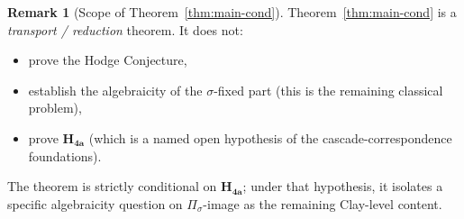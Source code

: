 \documentclass[11pt, a4paper]{amsart}
\theoremstyle{definition}
\newtheorem{remark}[theorem]{Remark}
\begin{document}
\begin{remark}[Scope of Theorem~\ref{thm:main-cond}]
\label{rmk:scope-main}
Theorem~\ref{thm:main-cond} is a \emph{transport / reduction}
theorem. It does not:
\begin{itemize}
\item prove the Hodge Conjecture,
\item establish the algebraicity of the $\sigma$-fixed part (this
  is the remaining classical problem),
\item prove $\mathbf{H_{4a}}$ (which is a named open hypothesis of
  the cascade-correspondence foundations).
\end{itemize}
The theorem is strictly conditional on $\mathbf{H_{4a}}$; under
that hypothesis, it isolates a specific algebraicity question on
$\Pi_\sigma$-image as the remaining Clay-level content.
\end{remark}
\end{document}
